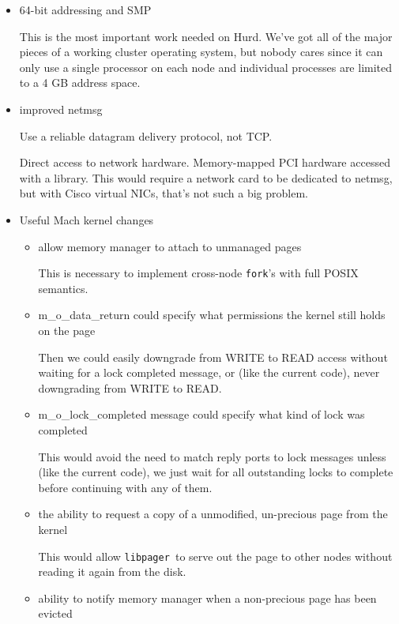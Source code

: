 \documentclass{article}
\def\libpager{{\tt libpager\ }}
\begin{document}
\begin{itemize}

\item 64-bit addressing and SMP

This is the most important work needed on Hurd.  We've got all of the
major pieces of a working cluster operating system, but nobody cares
since it can only use a single processor on each node and individual
processes are limited to a 4 GB address space.

\item improved netmsg

Use a reliable datagram delivery protocol, not TCP.

Direct access to network hardware.  Memory-mapped PCI hardware
accessed with a library.  This would require a network card
to be dedicated to netmsg, but with Cisco virtual NICs, that's
not such a big problem.

\item Useful Mach kernel changes

\begin{itemize}

\item allow memory manager to attach to unmanaged pages

  This is necessary to implement cross-node {\tt fork}'s with full POSIX semantics.

\item m_o_data_return could specify what permissions the kernel still holds on the page

  Then
  we could easily downgrade from WRITE to READ access without waiting for a lock completed
  message, or (like the current code), never downgrading from WRITE to READ.

\item m_o_lock_completed message could specify what kind of lock was completed

  This would avoid the
  need to match reply ports to lock messages unless (like the current code), we just
  wait for all outstanding locks to complete before continuing with any of them.

\item the ability to request a copy of a unmodified, un-precious page from the kernel

  This would allow \libpager to serve out the page to other nodes without reading it again from the disk.

\item ability to notify memory manager when a non-precious page has been evicted


\end{itemize}
\end{itemize}
\end{document}
